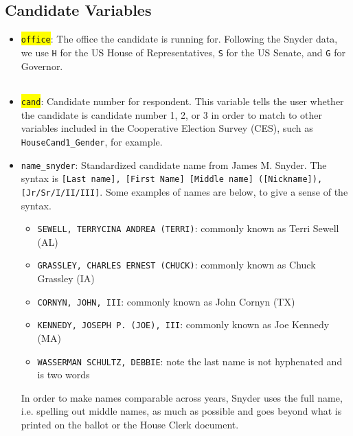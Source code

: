 \documentclass[12pt]{article}
\begin{document}
\subsection{Candidate Variables}

\begin{itemize}[leftmargin=*]

\item \colorbox{yellow}{\texttt{office}}: The office the candidate is running for. Following the Snyder data, we use \texttt{H} for the US House of Representatives, \texttt{S} for the US Senate, and \texttt{G} for Governor. 

    \begin{tabularx}{\linewidth}{C}
    
    \end{tabularx}
			
\item \colorbox{yellow}{\texttt{cand}}: Candidate number for respondent. This variable tells the user whether the candidate is candidate number 1, 2, or 3 in order to match to other variables included in the Cooperative Election Survey (CES), such as \texttt{HouseCand1\_Gender}, for example.

\begin{center}

\end{center}


\item \texttt{name\_snyder}: Standardized candidate name from James M. Snyder.  The syntax is \texttt{[Last name], [First Name] [Middle name] ([Nickname]), [Jr/Sr/I/II/III]}.  Some examples of names are below, to give a sense of the syntax.

\begin{itemize}
	\item[] \texttt{SEWELL, TERRYCINA ANDREA (TERRI)}: commonly known as Terri Sewell (AL)
	\item[] \texttt{GRASSLEY, CHARLES ERNEST (CHUCK)}: commonly known as Chuck Grassley (IA)
	\item[] \texttt{CORNYN, JOHN, III}: commonly known as John Cornyn (TX)
	\item[] \texttt{KENNEDY, JOSEPH P. (JOE), III}: commonly known as Joe Kennedy (MA)
	\item[] \texttt{WASSERMAN SCHULTZ, DEBBIE}: note the last name is not hyphenated and is two words
\end{itemize}

In order to make names comparable across years, Snyder uses the full name, i.e. spelling out middle names, as much as possible and goes beyond what is printed on the ballot or the House Clerk document.


\end{itemize}
\end{document}
